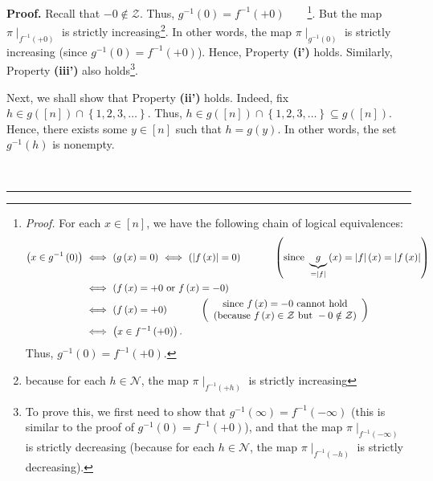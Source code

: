 \documentclass[numbers=enddot,12pt,final,onecolumn,notitlepage]{scrartcl}%
\theoremstyle{definition}
\newenvironment{proof}[1][Proof]{\noindent\textbf{#1.} }{\ \rule{0.5em}{0.5em}}
\newenvironment{verlong}{}{}
\begin{document}
\begin{verlong}
\begin{proof}
Recall that $-0\notin\mathcal{Z}$. Thus, $g^{-1}\left(  0\right)
=f^{-1}\left(  +0\right)  $\ \ \ \ \footnote{\textit{Proof.} For each
$x\in\left[  n\right]  $, we have the following chain of logical equivalences:%
\begin{align*}
\left(  x\in g^{-1}\left(  0\right)  \right)  \  &  \Longleftrightarrow
\ \left(  g\left(  x\right)  =0\right)  \ \Longleftrightarrow\ \left(
\left\vert f\left(  x\right)  \right\vert =0\right)
\ \ \ \ \ \ \ \ \ \ \left(  \text{since }\underbrace{g}_{=\left\vert
f\right\vert }\left(  x\right)  =\left\vert f\right\vert \left(  x\right)
=\left\vert f\left(  x\right)  \right\vert \right) \\
&  \Longleftrightarrow\ \left(  f\left(  x\right)  =+0\text{ or }f\left(
x\right)  =-0\right) \\
&  \Longleftrightarrow\ \left(  f\left(  x\right)  =+0\right)
\ \ \ \ \ \ \ \ \ \ \left(
\begin{array}
[c]{c}%
\text{since }f\left(  x\right)  =-0\text{ cannot hold}\\
\text{(because }f\left(  x\right)  \in\mathcal{Z}\text{ but }-0\notin%
\mathcal{Z}\text{)}%
\end{array}
\right) \\
&  \Longleftrightarrow\ \left(  x\in f^{-1}\left(  +0\right)  \right)  .
\end{align*}
Thus, $g^{-1}\left(  0\right)  =f^{-1}\left(  +0\right)  $.}. But the map
$\pi\mid_{f^{-1}\left(  +0\right)  }$ is strictly increasing\footnote{because
for each $h\in\mathcal{N}$, the map $\pi\mid_{f^{-1}\left(  +h\right)  }$ is
strictly increasing}. In other words, the map $\pi\mid_{g^{-1}\left(
0\right)  }$ is strictly increasing (since $g^{-1}\left(  0\right)
=f^{-1}\left(  +0\right)  $). Hence, Property \textbf{(i')} holds. Similarly,
Property \textbf{(iii')} also holds\footnote{To prove this, we first need to
show that $g^{-1}\left(  \infty\right)  =f^{-1}\left(  -\infty\right)  $ (this
is similar to the proof of $g^{-1}\left(  0\right)  =f^{-1}\left(  +0\right)
$), and that the map $\pi\mid_{f^{-1}\left(  -\infty\right)  }$ is strictly
decreasing (because for each $h\in\mathcal{N}$, the map $\pi\mid
_{f^{-1}\left(  -h\right)  }$ is strictly decreasing).}.

Next, we shall show that Property \textbf{(ii')} holds. Indeed, fix $h\in
g\left(  \left[  n\right]  \right)  \cap\left\{  1,2,3,\ldots\right\}  $.
Thus, $h\in g\left(  \left[  n\right]  \right)  \cap\left\{  1,2,3,\ldots
\right\}  \subseteq g\left(  \left[  n\right]  \right)  $. Hence, there exists
some $y\in\left[  n\right]  $ such that $h=g\left(  y\right)  $. In other
words, the set $g^{-1}\left(  h\right)  $ is nonempty.


\end{proof}
\end{verlong}
\end{document}
